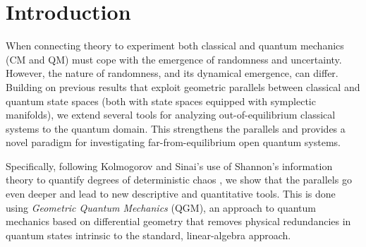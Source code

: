 \documentclass[draft,nofootinbib,pre,twocolumn,showkeys,superscriptaddress,preprintnumbers,floatfix]{revtex4-1}
\newcommand{\1}{\mathbbm{1}}
\begin{document}
\date{\today}


\begin{abstract}
\ourAbstract
\end{abstract}

\keywords{\ourKeywords}



\date{\today}
\maketitle






\section{Introduction}
\label{sec:Intro}

When connecting theory to experiment both classical and quantum mechanics (CM
and QM) must cope with the emergence of randomness and uncertainty. However,
the nature of randomness, and its dynamical emergence, can differ. Building on
previous results \cite{Anza20a,Sone21} that exploit geometric parallels between
classical and quantum state spaces (both with state spaces equipped with
symplectic manifolds), we extend several tools for analyzing out-of-equilibrium
classical systems to the quantum domain. This strengthens the parallels and
provides a novel paradigm for investigating far-from-equilibrium open quantum
systems.

Specifically, following Kolmogorov and Sinai's use of Shannon's information
theory \cite{Shan48a} to quantify degrees of deterministic chaos
\cite{Gelf56a,Kolm56a,Kolm59b,Kolm58,Kolm59,Sina59}, we show that the parallels
go even deeper and lead to new descriptive and quantitative tools. This is done
using \emph{Geometric Quantum Mechanics} (QGM), an approach to quantum
mechanics based on differential geometry that removes physical redundancies in
quantum states intrinsic to the standard, linear-algebra approach.
\end{document}
